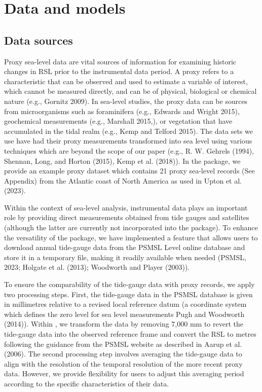 \hypertarget{background}{%
\section{Data and models}\label{background}}

\hypertarget{data}{%
\subsection{Data sources}\label{data}}

Proxy sea-level data are vital sources of information for examining historic changes in RSL prior to the instrumental data period. A proxy refers to a characteristic that can be observed and used to estimate a variable of interest, which cannot be measured directly, and can be of physical, biological or chemical nature (e.g., Gornitz 2009). In sea-level studies, the proxy data can be sources from microorganisms such as foraminifera (e.g., Edwards and Wright 2015), geochemical measurements (e.g., Marshall 2015,), or vegetation that have accumulated in the tidal realm (e.g., Kemp and Telford 2015). The data sets we use have had their proxy measurements transformed into sea level using various techniques which are beyond the scope of our paper (e.g., R. W. Gehrels (1994), Shennan, Long, and Horton (2015), Kemp et al. (2018)). In the  package, we provide an example proxy dataset which contains 21 proxy sea-level records (See Appendix) from the Atlantic coast of North America as used in Upton et al. (2023).

Within the context of sea-level analysis, instrumental data plays an important role by providing direct measurements obtained from tide gauges and satellites (although the latter are currently not incorporated into the  package). To enhance the versatility of the package, we have implemented a feature that allows users to download annual tide-gauge data from the PSMSL Level online database and store it in a temporary file, making it readily available when needed (PSMSL, 2023; Holgate et al. (2013); Woodworth and Player (2003)).

To ensure the comparability of the tide-gauge data with proxy records, we apply two processing steps. First, the tide-gauge data in the PSMSL database is given in millimetres relative to a revised local reference datum (a coordinate system which defines the zero level for sea level measurements Pugh and Woodworth (2014)). Within , we transform the data by removing 7,000 mm to revert the tide-gauge data into the observed reference frame and convert the RSL to metres following the guidance from the PSMSL website as described in Aarup et al. (2006). The second processing step involves averaging the tide-gauge data to align with the resolution of the temporal resolution of the more recent proxy data. However, we provide flexibility for users to adjust this averaging period according to the specific characteristics of their data.

